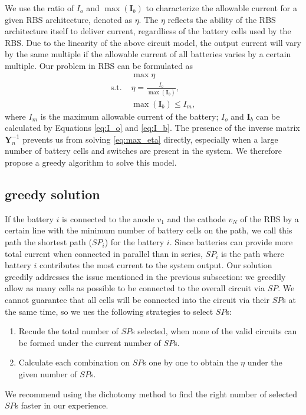 \documentclass{article}
\begin{document}
We use the ratio of $I_o$ and $\max (\bm{I}_b)$ to characterize the allowable current for a given RBS architecture, denoted as $\eta$.
The $\eta$ reflects the ability of the RBS architecture itself to deliver current, regardliess of the battery cells used by the RBS.
Due to the linearity of the above circuit model, the output current will vary by the same multiple if the allowable current of all batteries varies by a certain multiple.
Our problem in RBS can be formulated as
\begin{align}
        & \max \eta \label{eq:max_eta}\\
    \mathrm{s.t.}\,\, & \eta = \frac{I_o}{\max (\bm{I}_b)}, \\
        & \max (\bm{I}_b) \leq I_m,
\end{align}
where $I_m$ is the maximum allowable current of the battery; $I_o$ and $\bm{I}_b$ can be calculated by Equations \ref{eq:I_o} and \ref{eq:I_b}.
The presence of the inverse matrix $\bm{Y}_n^{-1}$ prevents us from solving \ref{eq:max_eta} directly, especially when a large number of battery cells and switches are present in the system.
We therefore propose a greedy algorithm to solve this model.


\subsection{greedy solution}
If the battery $i$ is connected to the anode $v_1$ and the cathode $v_N$ of the RBS by a certain line with the minimum number of battery cells on the path,
we call this path the shortest path ($SP_i$) for the battery $i$.
Since batteries can provide more total current when connected in parallel than in series, $SP_i$ is the path where battery $i$ contributes the most current to the system output.
Our solution greedily addresses the issue mentioned in the previous subsection: we greedily allow as many cells as possible to be connected to the overall circuit via $SP$.
We cannot guarantee that all cells will be connected into the circuit via their $SP$s at the same time, so we ues the following strategies to select $SP$s:
\begin{enumerate}[(1)]
    \item Recude the total number of $SP$s selected, when none of the valid circuits can be formed under the current number of $SP$s. 
    \item Calculate each combination on $SP$s one by one to obtain the $\eta$ under the given number of $SP$s. 
\end{enumerate}
We recommend using the dichotomy method to find the right number of selected $SP$s faster in our experience.
\end{document}
